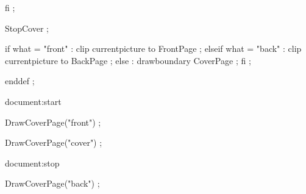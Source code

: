             fi ;

        StopCover ;

        if what = "front" :
            clip currentpicture to FrontPage ;
        elseif what = "back" :
            clip currentpicture to BackPage ;
        else :
            drawboundary CoverPage ;
        fi ;

    enddef ;

\stopMPinclusions

\startsetups document:start


    \setupbackgrounds[page][background=]

     {

        \startMPpage
            DrawCoverPage("front") ;
        \stopMPpage

    } {

        \startMPpage
            DrawCoverPage("cover") ;
        \stopMPpage

    }

    \page[dummy]

    \setupbackgrounds[page][background=page]

    \resetuserpagenumber


\stopsetups

\startsetups document:stop

     {


        \page

        \setuppagenumbering[page=]

        \setupbackgrounds[page][background=]


        \setupmakeup[doublesided=no,page=no]

        \startMPpage
            DrawCoverPage("back") ;
        \stopMPpage


    } {


    }

\stopsetups

\stopenvironment
